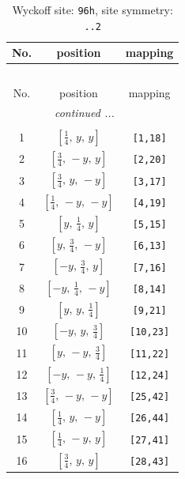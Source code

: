 \documentclass[fleqn,8pt]{jsarticle}
\begin{document}
\renewcommand{\arraystretch}{1.2}
\begin{longtable}{ccc}
\caption{Wyckoff site: {\tt 96h}, site symmetry: {\tt ..2}}
 \\
 \hline \hline
No. & position & mapping \\ \hline \endfirsthead

\multicolumn{2}{l}{\tablename\ \thetable{}} \\
 \hline \hline
No. & position & mapping \\ \hline \endhead

 \hline \hline
\multicolumn{2}{r}{\footnotesize\it continued ...} \\ \endfoot

 \hline \hline
\multicolumn{2}{r}{} \\ \endlastfoot

1 & $\left[ \frac{1}{4},\, y,\, y \right]$ & {\tt [1,18]} \\ \hline
2 & $\left[ \frac{3}{4},\, - y,\, y \right]$ & {\tt [2,20]} \\ \hline
3 & $\left[ \frac{3}{4},\, y,\, - y \right]$ & {\tt [3,17]} \\ \hline
4 & $\left[ \frac{1}{4},\, - y,\, - y \right]$ & {\tt [4,19]} \\ \hline
5 & $\left[ y,\, \frac{1}{4},\, y \right]$ & {\tt [5,15]} \\ \hline
6 & $\left[ y,\, \frac{3}{4},\, - y \right]$ & {\tt [6,13]} \\ \hline
7 & $\left[ - y,\, \frac{3}{4},\, y \right]$ & {\tt [7,16]} \\ \hline
8 & $\left[ - y,\, \frac{1}{4},\, - y \right]$ & {\tt [8,14]} \\ \hline
9 & $\left[ y,\, y,\, \frac{1}{4} \right]$ & {\tt [9,21]} \\ \hline
10 & $\left[ - y,\, y,\, \frac{3}{4} \right]$ & {\tt [10,23]} \\ \hline
11 & $\left[ y,\, - y,\, \frac{3}{4} \right]$ & {\tt [11,22]} \\ \hline
12 & $\left[ - y,\, - y,\, \frac{1}{4} \right]$ & {\tt [12,24]} \\ \hline
13 & $\left[ \frac{3}{4},\, - y,\, - y \right]$ & {\tt [25,42]} \\ \hline
14 & $\left[ \frac{1}{4},\, y,\, - y \right]$ & {\tt [26,44]} \\ \hline
15 & $\left[ \frac{1}{4},\, - y,\, y \right]$ & {\tt [27,41]} \\ \hline
16 & $\left[ \frac{3}{4},\, y,\, y \right]$ & {\tt [28,43]} \\ \hline

\end{longtable}
\end{document}
